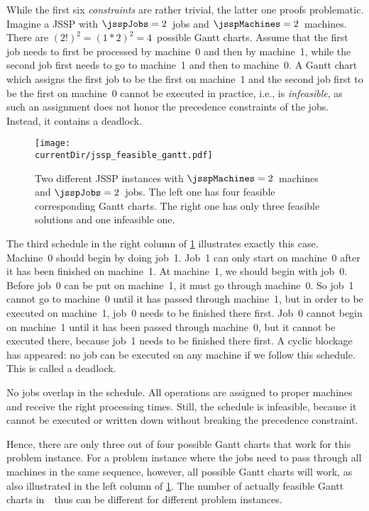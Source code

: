 %
While the first six \emph{constraints} are rather trivial, the latter one proofs problematic.
Imagine a \gls{JSSP} with $\jsspJobs=2$~jobs and $\jsspMachines=2$~machines.
There are $(2!)^2=(1*2)^2=4$~possible Gantt charts.
Assume that the first job needs to first be processed by machine~0 and then by machine~1, while the second job first needs to go to machine~1 and then to machine~0.
A Gantt chart which assigns the first job to be the first on machine~1 and the second job first to be the first on machine~$0$ cannot be executed in practice, i.e., is \emph{infeasible}, as such an assignment does not honor the precedence constraints of the jobs.
Instead, it contains a deadlock.

\begin{figure}%
\centering%
\texttt{[image: \\currentDir/jssp\_feasible\_gantt.pdf]}%
\caption{Two different JSSP instances with $\jsspMachines=2$~machines and $\jsspJobs=2$~jobs.%
The left one has four feasible corresponding Gantt charts.
The right one has only three feasible solutions and one infeasible one.}%
\label{fig:jssp_feasible_gantt}%
\end{figure}%

The third schedule in the right column of \cref{fig:jssp_feasible_gantt} illustrates exactly this case.
Machine~0 should begin by doing job~1.
Job~1 can only start on machine~0 after it has been finished on machine~1.
At machine~1, we should begin with job~0.
Before job~0 can be put on machine~1, it must go through machine~0.
So job~1 cannot go to machine~0 until it has passed through machine~1, but in order to be executed on machine~1, job~0 needs to be finished there first.
Job~0 cannot begin on machine~1 until it has been passed through machine~0, but it cannot be executed there, because job~1 needs to be finished there first.
A cyclic blockage has appeared: no job can be executed on any machine if we follow this schedule.
This is called a deadlock.

No jobs overlap in the schedule.
All operations are assigned to proper machines and receive the right processing times.
Still, the schedule is infeasible, because it cannot be executed or written down without breaking the precedence constraint.

Hence, there are only three out of four possible Gantt charts that work for this problem instance.
For a problem instance where the jobs need to pass through all machines in the same sequence, however, all possible Gantt charts will work, as also illustrated in the left column of \cref{fig:jssp_feasible_gantt}.
The number of actually feasible Gantt charts in~\solutionSpace\ thus can be different for different problem instances.

